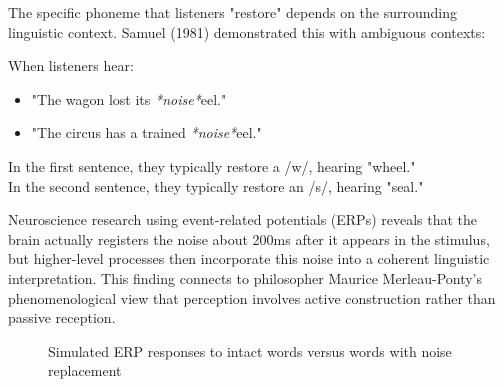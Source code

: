 \documentclass[12pt,a4paper]{article}
\begin{document}
The specific phoneme that listeners "restore" depends on the surrounding linguistic context. Samuel (1981) demonstrated this with ambiguous contexts:

\begin{tcolorbox}[enhanced, colback=green!5, colframe=green!75!black, title=Context-Dependent Restoration]
When listeners hear:
\begin{itemize}
\item "The wagon lost its \textit{*noise*}eel."
\item "The circus has a trained \textit{*noise*}eel."
\end{itemize}

In the first sentence, they typically restore a /w/, hearing "wheel."\\
In the second sentence, they typically restore an /s/, hearing "seal."
\end{tcolorbox}

Neuroscience research using event-related potentials (ERPs) reveals that the brain actually registers the noise about 200ms after it appears in the stimulus, but higher-level processes then incorporate this noise into a coherent linguistic interpretation. This finding connects to philosopher Maurice Merleau-Ponty's phenomenological view that perception involves active construction rather than passive reception.

\begin{figure}[h]
\centering
{}
\caption{Simulated ERP responses to intact words versus words with noise replacement}
\label{fig:erp_phonemic}
\end{figure}
\end{document}
